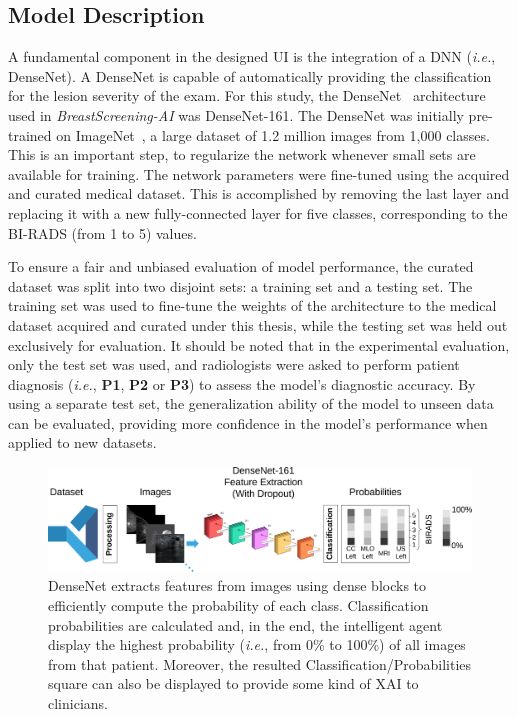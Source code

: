 \subsection{Model Description}
\label{sec:app003003005}

A fundamental component in the designed \ac{UI} is the integration of a \ac{DNN} ({\it i.e.}, DenseNet).
A DenseNet is capable of automatically providing the classification for the lesion severity of the exam.
For this study, the DenseNet~\cite{Huang_2017_CVPR} architecture used in {\it BreastScreening-AI} was DenseNet-161.
The DenseNet was initially pre-trained on ImageNet~\cite{10.1145/3351095.3375709}, a large dataset of 1.2 million images from 1,000 classes.
This is an important step, to regularize the network whenever small sets are available for training.
The network parameters were fine-tuned using the acquired and curated medical dataset.
This is accomplished by removing the last layer and replacing it with a new fully-connected layer for five classes, corresponding to the \ac{BI-RADS} (from 1 to 5) values.

To ensure a fair and unbiased evaluation of model performance, the curated dataset was split into two disjoint sets: a training set and a testing set.
The training set was used to fine-tune the weights of the architecture to the medical dataset acquired and curated under this thesis, while the testing set was held out exclusively for evaluation.
It should be noted that in the experimental evaluation, only the test set was used, and radiologists were asked to perform patient diagnosis ({\it i.e.}, {\bf P1}, {\bf P2} or {\bf P3}) to assess the model's diagnostic accuracy.
By using a separate test set, the generalization ability of the model to unseen data can be evaluated, providing more confidence in the model's performance when applied to new datasets.

\begin{figure}[htbp]
\centering
\includegraphics[width=\textwidth]{images/fig042}
\caption{DenseNet extracts features from images using dense blocks to efficiently compute the probability of each class. Classification probabilities are calculated and, in the end, the intelligent agent display the highest probability ({\it i.e.}, from 0\% to 100\%) of all images from that patient. Moreover, the resulted Classification/Probabilities square can also be displayed to provide some kind of XAI to clinicians.}
\label{fig:fig042}
\end{figure}

